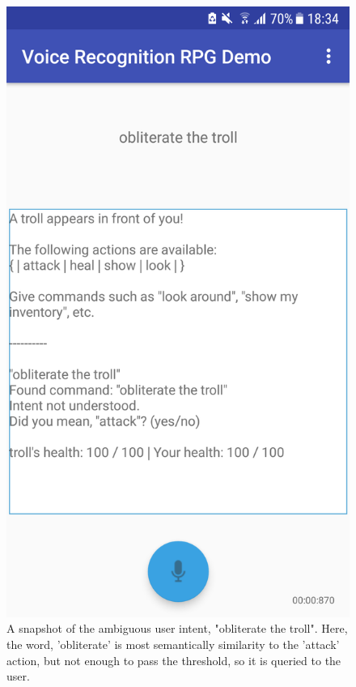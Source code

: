 \documentclass[11pt]{article}
\begin{document}
\begin{center}
\begin{figure}
\begin{center}
  \includegraphics[scale=0.25]{Screenshot_20180522-183411.png}
  \caption{A snapshot of the ambiguous user intent, "obliterate the troll". Here, the word, 'obliterate' is most semantically similarity to the 'attack' action, but not enough to pass the threshold, so it is queried to the user.}
  \label{fig:snapshot-suggestion}
  \end{center}
\end{figure}
\end{center}
\end{document}
